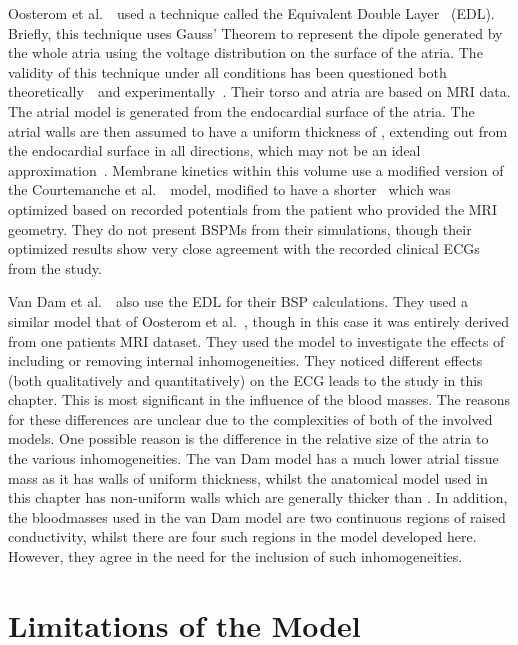 Oosterom et al.~\cite{Oosterom2005}\ used a technique called the Equivalent
Double Layer~\cite{Huiskamp1988} (EDL).
Briefly, this technique uses Gauss' Theorem to represent the dipole generated by
the whole atria using the voltage distribution on the surface of the atria.
The validity of this technique under all conditions has been questioned both
theoretically~\cite{Geselowitz1989a,Geselowitz1992}\ and experimentally~\cite{Scher1994}.
Their torso and atria are based on MRI data.
The atrial model is generated from the endocardial surface of the atria.
The atrial walls are then assumed to have a uniform thickness of ,
extending out from the endocardial surface in all directions, which may not be
an ideal approximation~\cite{Ho2009}.
Membrane kinetics within this volume use a modified version of the Courtemanche
et al.~\cite{CRN98}\ model, modified to have a shorter \apd\ which was
optimized based on recorded potentials from the patient who provided the MRI
geometry.
They do not present BSPMs from their simulations, though their optimized results
show very close agreement with the recorded clinical ECGs from the study.

Van Dam et al.~\cite{vanDam2005}\ also use the EDL for their BSP calculations.
They used a similar model that of Oosterom et al.~\cite{Oosterom2005}, though in
this case it was entirely derived from one patients MRI dataset.
They used the model to investigate the effects of including or removing internal
inhomogeneities.
They noticed different effects (both qualitatively and quantitatively) on the
ECG leads to the study in this chapter.
This is most significant in the influence of the blood masses.
The reasons for these differences are unclear due to the complexities of both of
the involved models.
One possible reason is the difference in the relative size of the atria to the various
inhomogeneities.
The van Dam model has a much lower atrial tissue mass as it has walls of uniform
thickness, whilst the anatomical model used in this chapter has non-uniform
walls which are generally thicker than .
In addition, the bloodmasses used in the van Dam model are two continuous
regions of raised conductivity, whilst there are four such regions in the model
developed here.
However, they agree in the need for the inclusion of such inhomogeneities.

\section{Limitations of the Model}
\label{sec:bsp:limits}

